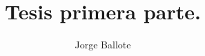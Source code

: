 \documentclass[12pt]{book}
\theoremstyle{plain}
\begin{document}
\title{Tesis primera parte.}
\author{Jorge Ballote}
\thispagestyle{plain}

\tableofcontents
% 
\newpage
{}






 
% 
% 




\end{document}
